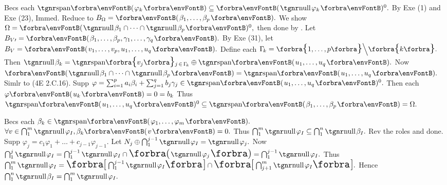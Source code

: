 Becs each $\Span{\varphi_k}\subseteq\Par{\null\varphi_k}{^0}.$ By {\NOTEFOR} Exe (1) and Exe (23), Immed.\PfEnd\parSol{\vspace{4pt}}
\Or Reduce to $B_{\Omega}=\Par{\beta_1,\dots,\beta_p}.$ We show $\Omega=\Par{\null\beta_1\cap\cdots\cap\null\beta_p}{^0},$ then done by .\parSol{}
Let $B_{V\apostrophe}=\Par{\beta_1,\dots,\beta_p,\gamma_1,\dots,\gamma_q}.$ By Exe (31), let $B_V=\Par{v_1,\dots,v_p,u_1,\dots,u_q}.$\parSol{}
Define each $\Gamma_{\!k}=\Bra{1,\dots,p}\Backslash[\Big]\Bra{k}.$ Then $\null\beta_k=\Span[\Bra]{v_j}{_{j\,\in\,\Gamma_{\!k}}}\oplus\Span{u_1,\dots,u_q}.$\parSol{}
Now $\Par{\null\beta_1\cap\cdots\cap\null\beta_p}=\Span{u_1,\dots,u_q}.$ Simlr to (4E 2.C.16).\parSol{}
Supp $\varphi=\sum_{i=1}^pa_i\beta_i+\sum_{j=1}^qb_j\gamma_j\in\Span{u_1,\dots,u_q}{^0}.$ Then each $\varphi\Par{u_k}=0=b_k$\parSol{}
Thus $\Span{u_1,\dots,u_q}{^0}\subseteq\Span{\beta_1,\dots,\beta_p}=\Omega.$\PfEnd
\SepLine

Becs each $\beta_k\in\Span{\varphi_1,\dots,\varphi_m}.$\parSol{}
$\forall v\in\bigcap_1^m\null\varphi_I,\beta_k\Par{v}=0.$ Thus $\bigcap_1^m\null\varphi_I\subseteq\bigcap_1^n\null\beta_I.$ \;Rev the roles and done.\PfEnd\vspace{2pt}
\ANote Supp $\varphi_j=c_1\varphi_1+\dots+c_{j-1}\varphi_{j-1}.$\parNot{\vspace{2pt}}
Let $N_j\oplus\bigcap_1^{j-1}\null\varphi_I=\null\varphi_j.$ Now $\bigcap_1^j\null\varphi_I=\bigcap_1^{j-1}\null\varphi_I\cap\BigPar{\null\varphi_j}=\bigcap_1^{j-1}\null\varphi_I.$\parNot{\vspace{2pt}}
Thus $\bigcap_1^m\null\varphi_I=\Sbra{\bigcap_1^{j-1}\null\varphi_I}\cap\Sbra{\bigcap_{j+1}^m\null\varphi_I}.$ \;Hence $\bigcap_1^n\null\beta_I=\bigcap_{1}^m\null\varphi_I.$
\SepLine

